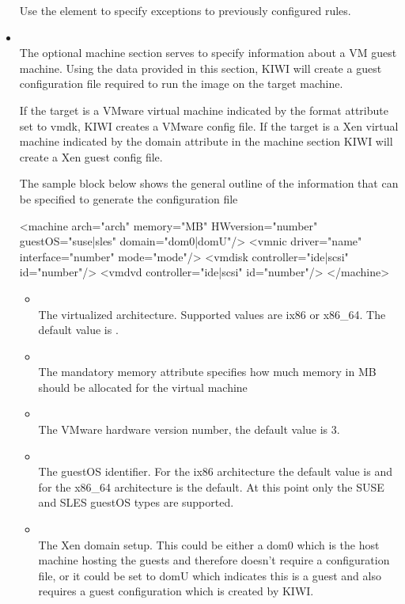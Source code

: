 \begin{itemize}
    Use the  element to specify exceptions to previously
    configured rules.

\item {}\\
    The optional machine section serves to specify information
    about a VM guest machine. Using the data provided in this section,
    KIWI will create a guest configuration file required to run the
    image on the target machine.

    If the target is a VMware virtual machine indicated by the
    format attribute set to vmdk, KIWI creates a VMware config file.
    If the target is a Xen virtual machine indicated by the domain
    attribute in the machine section KIWI will create a Xen guest
    config file.

    The sample block below shows the general outline of the information
    that can be specified to generate the configuration file

\begin{xml}
<machine arch="arch" memory="MB" HWversion="number"
         guestOS="suse|sles" domain="dom0|domU"/>
  <vmnic driver="name" interface="number" mode="mode"/>
  <vmdisk controller="ide|scsi" id="number"/>
  <vmdvd controller="ide|scsi" id="number"/>
</machine>
\end{xml}

	\begin{itemize}
	\item {}\\
      The virtualized architecture. Supported values are ix86 or x86\_64.
      The default value is .
	\item {}\\
      The mandatory memory attribute specifies how much memory in MB
      should be allocated for the virtual machine
	\item {}\\
      The VMware hardware version number, the default value is 3.
	\item {}\\
      The guestOS identifier. For the ix86 architecture the default 
      value is  and for the x86\_64 architecture
       is the default. At this point only the SUSE and
      SLES guestOS types are supported.
	\item {}\\
      The Xen domain setup. This could be either a dom0 which is the
      host machine hosting the guests and therefore doesn't require a
      configuration file, or it could be set to domU which indicates
      this is a guest and also requires a guest configuration which is
      created by KIWI.
	\end{itemize}


\end{itemize}
